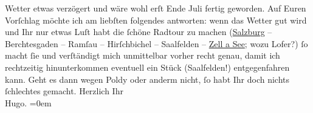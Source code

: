 \begin{ledgroupsized}[t]{13cm}
               Wetter etwas verzögert und wäre wohl erſt Ende Juli fertig geworden.\pend
           \pstart
           Auf Euren Vorſchlag möchte ich am liebſten folgendes antworten: wenn das Wetter gut
               wird und Ihr nur etwas Luſt habt die ſchöne Radtour zu machen (\uline{Salzburg} – Berchtesgaden – Ramſau – Hirſchbichel –
                  Saalfelden – \uline{Zell a See}; wozu Lofer?) ſo macht ſie und
               verſtändigt {\pb}mich unmittelbar
               vorher \introOben{}recht genau\introOben{}, damit ich rechtzeitig hinunterkommen
               eventuell ein Stück (Saalfelden!)
               entgegenfahren kann. Geht es dann wegen Poldy
               oder anderm nicht, ſo habt Ihr doch nichts ſchlechtes gemacht.\pend
           \pstart
           Herzlich Ihr{\\[\baselineskip]}\spacefill\mbox{Hugo.}\pend
           \leftskip=0em{}
         
         \endnumbering{}\end{ledgroupsized}  \newcommand{\dateiname}{L00703}\newcommand{\titel}{Hugo von Hofmannsthal an Arthur Schnitzler, 16. [7. 1897]}\newcommand{\editorInnen}{Martin Anton Müller und Gerd-Hermann Susen}
      